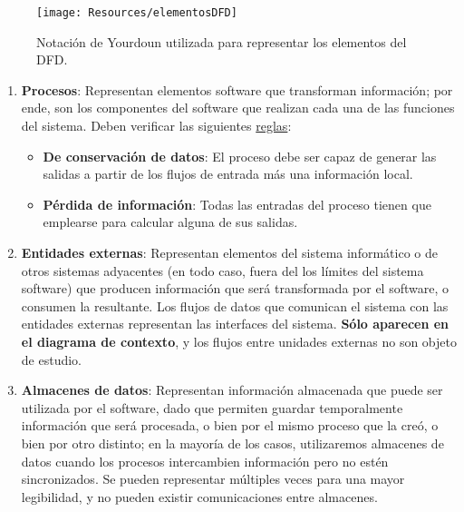 \begin{figure}[H]
    \centering
    \texttt{[image: Resources/elementosDFD]}
    \caption{Notación de Yourdoun utilizada para representar los elementos del DFD.}
    \label{fig:elementosDFD}
\end{figure}
\begin{enumerate}
    \item \textbf{Procesos}: Representan elementos software que transforman información; por ende, son los componentes del software que realizan cada una de las funciones del sistema. Deben verificar las siguientes \uline{reglas}:
    \begin{itemize}
        \item \textbf{De conservación de datos}: El proceso debe ser capaz de generar las salidas a partir de los flujos de entrada más una información local.
        \item \textbf{Pérdida de información}: Todas las entradas del proceso tienen que emplearse para calcular alguna de sus salidas.
    \end{itemize}

    \item \textbf{Entidades externas}: Representan elementos del sistema informático o de otros sistemas adyacentes (en todo caso, fuera del los límites del sistema software) que producen información que será transformada por el software, o consumen la resultante. Los flujos de datos que comunican el sistema con las entidades externas representan las interfaces del sistema. \textbf{Sólo aparecen en el diagrama de contexto}, y los flujos entre unidades externas no son objeto de estudio.

    \item \textbf{Almacenes de datos}: Representan información almacenada que puede ser utilizada por el software, dado que permiten guardar temporalmente información que será procesada, o bien por el mismo proceso que la creó, o bien por otro distinto; en la mayoría de los casos, utilizaremos almacenes de datos cuando los procesos intercambien información pero no estén sincronizados. Se pueden representar múltiples veces para una mayor legibilidad, y no pueden existir comunicaciones entre almacenes.


\end{enumerate}

